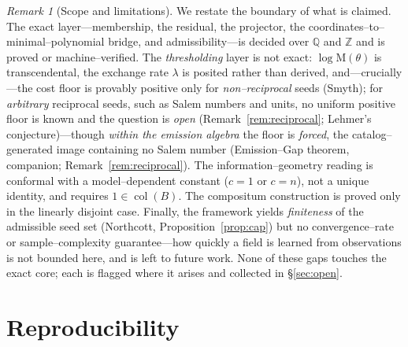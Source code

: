\documentclass[11pt]{article}
\theoremstyle{plain}
\theoremstyle{definition}
\theoremstyle{remark}
\newtheorem{remark}[theorem]{Remark}
\newcommand{\Q}{\mathbb{Q}}
\newcommand{\Z}{\mathbb{Z}}
\newcommand{\Mah}{\mathrm{M}}
\newcommand{\BB}{B}
\DeclareMathOperator{\col}{col}
\begin{document}
\begin{remark}[Scope and limitations]\label{rem:limits}
We restate the boundary of what is claimed. The exact layer---membership, the residual, the projector, the
coordinates--to--minimal--polynomial bridge, and admissibility---is decided over $\Q$ and $\Z$ and is proved
or machine--verified. The \emph{thresholding} layer is not exact: $\log\Mah(\theta)$ is transcendental, the
exchange rate $\lambda$ is posited rather than derived, and---crucially---the cost floor is provably positive
only for \emph{non--reciprocal} seeds (Smyth); for \emph{arbitrary} reciprocal seeds, such as Salem numbers
and units, no uniform positive floor is known and the question is \emph{open} (Remark~\ref{rem:reciprocal};
Lehmer's conjecture)---though \emph{within the emission algebra} the floor is \emph{forced}, the
catalog--generated image containing no Salem number (Emission--Gap theorem, companion; Remark~\ref{rem:reciprocal}).
The information--geometry
reading is conformal with a model--dependent constant ($c=1$ or $c=n$), not a unique identity, and requires
$1\in\col(\BB)$. The compositum construction is proved only in the linearly disjoint case. Finally, the
framework yields \emph{finiteness} of the admissible seed set (Northcott, Proposition~\ref{prop:cap}) but no
convergence--rate or sample--complexity guarantee---how quickly a field is learned from observations is not
bounded here, and is left to future work. None of these gaps touches the exact core; each is flagged where it
arises and collected in \S\ref{sec:open}.
\end{remark}

\appendix
\section{Reproducibility}\label{sec:appendix}
\end{document}
